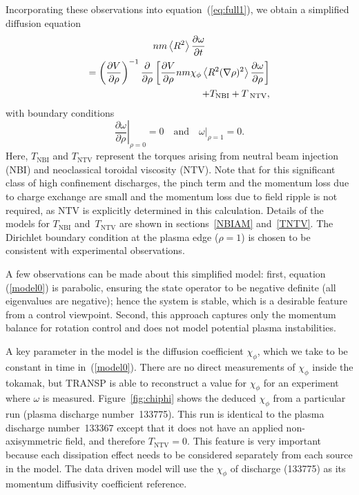 \documentclass{iopart}
\begin{document}
 Incorporating these observations into equation~(\ref{eq:full1}), we obtain a simplified diffusion equation
\begin{multline}
 n m \left<R^2\right>
 \frac{\partial \omega}{\partial t} \\
 = \left( \frac{\partial V}{\partial\rho}\right)^{-1}
   \frac{\partial}{\partial \rho} 
   \left[\frac{\partial V}{\partial \rho} n m \chi_\phi 
   \left< R^2 (\nabla \rho)^2\right> 
   \frac{\partial\omega}{\partial\rho}\right] \\
   \hfill + T_\text{NBI} + T_\text{ NTV},
		\label{model0}
\end{multline}
with boundary conditions
\begin{equation}
\left.\frac{\partial\omega}{\partial\rho}\right|_{\rho=0} = 0 
\quad \text{and} \quad 
\left.\omega\right|_{\rho=1} = 0.
\label{bc0}
\end{equation}
Here, $T_\text{NBI} $ and $T_\text{NTV}$ represent the torques
arising from neutral beam injection (NBI) and neoclassical toroidal viscosity
(NTV). Note that for this significant class of high confinement discharges, the
pinch term and  the momentum loss due to charge exchange are small and the
momentum loss due to  field ripple is not required, as NTV is explicitly
determined in this calculation. Details of the models for $T_\text{NBI}$
and~$T_\text{NTV}$ are shown in sections~\ref{NBIAM} and~\ref{TNTV}.  The
Dirichlet boundary condition at the plasma edge ($\rho=1$) is chosen to be
consistent with experimental observations.
  
A few observations can be made about this simplified model: first, equation  (\ref{model0}) is parabolic, ensuring the state operator to be negative definite (all eigenvalues are negative);  hence the system is stable, which is a desirable feature from a control viewpoint. 
Second, this approach captures only the momentum balance for rotation control and does not model potential plasma instabilities.
  
A key parameter in the model is the diffusion coefficient $\chi_\phi$, which we
take to be constant in time in~(\ref{model0}).
There are no direct measurements of $\chi_\phi$ inside the tokamak, but TRANSP
is able to reconstruct a value for $\chi_\phi$ for an experiment where $\omega$
is measured.
%
Figure~{\ref{fig:chiphi}} shows the deduced $\chi_\phi$ from a particular run (plasma discharge number~133775). This run is identical to the plasma discharge number~133367 except that it does not have an applied non-axisymmetric field, and therefore $T_\text{NTV} = 0$. This feature is very important because each dissipation effect needs to be considered separately from each source in the model. The data driven model will use the $\chi_\phi$ of discharge (133775) as its momentum diffusivity coefficient reference.
\end{document}

